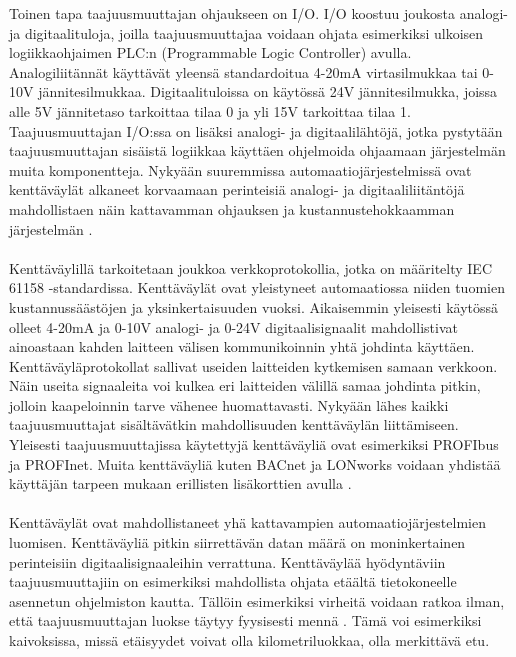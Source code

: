 \documentclass[finnish,12pt,a4paper,pdftex,elec,utf8]{aaltothesis}
\begin{document}
\noindent
Toinen tapa taajuusmuuttajan ohjaukseen on I/O. I/O koostuu joukosta analogi- ja digitaalituloja, joilla taajuusmuuttajaa voidaan ohjata esimerkiksi ulkoisen logiikkaohjaimen PLC:n (Programmable Logic Controller) avulla. Analogiliitännät käyttävät yleensä standardoitua 4-20mA virtasilmukkaa tai 0-10V jännitesilmukkaa. Digitaalituloissa on käytössä 24V jännitesilmukka, joissa alle 5V jännitetaso tarkoittaa tilaa 0 ja yli 15V tarkoittaa tilaa 1. Taajuusmuuttajan I/O:ssa on lisäksi analogi- ja digitaalilähtöjä, jotka pystytään taajuusmuuttajan sisäistä logiikkaa käyttäen ohjelmoida ohjaamaan järjestelmän muita komponentteja. Nykyään suuremmissa automaatiojärjestelmissä ovat kenttäväylät alkaneet korvaamaan perinteisiä analogi- ja digitaaliliitäntöjä mahdollistaen näin kattavamman ohjauksen ja kustannustehokkaamman järjestelmän \cite{MyyntiHaastattelu}.
\\\\
Kenttäväylillä tarkoitetaan joukkoa verkkoprotokollia, jotka on määritelty IEC 61158 -standardissa. Kenttäväylät ovat yleistyneet automaatiossa niiden tuomien kustannussäästöjen ja yksinkertaisuuden vuoksi. Aikaisemmin yleisesti käytössä olleet 4-20mA ja 0-10V analogi- ja 0-24V digitaalisignaalit mahdollistivat ainoastaan kahden laitteen välisen kommunikoinnin yhtä johdinta käyttäen. Kenttäväyläprotokollat sallivat useiden laitteiden kytkemisen samaan verkkoon. Näin useita signaaleita voi kulkea eri laitteiden välillä samaa johdinta pitkin, jolloin kaapeloinnin tarve vähenee huomattavasti. Nykyään lähes kaikki taajuusmuuttajat sisältävätkin mahdollisuuden kenttäväylän liittämiseen. Yleisesti taajuusmuuttajissa käytettyjä kenttäväyliä ovat esimerkiksi PROFIbus ja PROFInet. Muita kenttäväyliä kuten BACnet ja LONworks voidaan yhdistää käyttäjän tarpeen mukaan erillisten lisäkorttien avulla \cite{880hwman}.
\\\\
Kenttäväylät ovat mahdollistaneet yhä kattavampien automaatiojärjestelmien luomisen. Kenttäväyliä pitkin siirrettävän datan määrä on moninkertainen perinteisiin digitaalisignaaleihin verrattuna. Kenttäväylää hyödyntäviin taajuusmuuttajiin on esimerkiksi mahdollista ohjata etäältä tietokoneelle asennetun ohjelmiston kautta. Tällöin esimerkiksi virheitä voidaan ratkoa ilman, että taajuusmuuttajan luokse täytyy fyysisesti mennä \cite{MyyntiHaastattelu}. Tämä voi esimerkiksi kaivoksissa, missä etäisyydet voivat olla kilometriluokkaa, olla merkittävä etu.
\\\\
\end{document}
